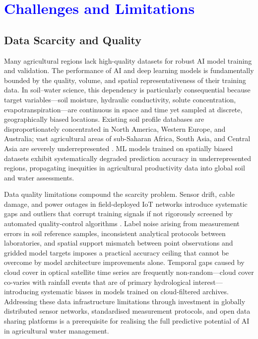 \documentclass[land,article,submit,pdftex,moreauthors]{Definitions/mdpi}
\numberwithin{equation}{section}
\begin{document}
\section{\textcolor{blue}{Challenges and Limitations}}

\subsection{Data Scarcity and Quality}

Many agricultural regions lack high-quality datasets for robust AI model training and validation. The performance of AI and deep learning models is fundamentally bounded by the quality, volume, and spatial representativeness of their training data. In soil--water science, this dependency is particularly consequential because target variables---soil moisture, hydraulic conductivity, solute concentration, evapotranspiration---are continuous in space and time yet sampled at discrete, geographically biased locations. Existing soil profile databases are disproportionately concentrated in North America, Western Europe, and Australia; vast agricultural areas of sub-Saharan Africa, South Asia, and Central Asia are severely underrepresented \citep{hengl2017soilgrids250m}. ML models trained on spatially biased datasets exhibit systematically degraded prediction accuracy in underrepresented regions, propagating inequities in agricultural productivity data into global soil and water assessments.

Data quality limitations compound the scarcity problem. Sensor drift, cable damage, and power outages in field-deployed IoT networks introduce systematic gaps and outliers that corrupt training signals if not rigorously screened by automated quality-control algorithms \citep{gruber2020}. Label noise arising from measurement errors in soil reference samples, inconsistent analytical protocols between laboratories, and spatial support mismatch between point observations and gridded model targets imposes a practical accuracy ceiling that cannot be overcome by model architecture improvements alone. Temporal gaps caused by cloud cover in optical satellite time series are frequently non-random---cloud cover co-varies with rainfall events that are of primary hydrological interest---introducing systematic biases in models trained on cloud-filtered archives. Addressing these data infrastructure limitations through investment in globally distributed sensor networks, standardised measurement protocols, and open data sharing platforms is a prerequisite for realising the full predictive potential of AI in agricultural water management.
\end{document}
